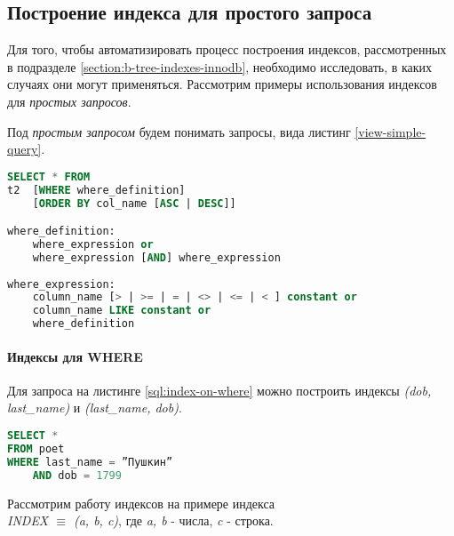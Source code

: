 \subsection{Построение индекса для простого запроса}
\label{section:simple-index}

Для того, чтобы автоматизировать процесс построения индексов, рассмотренных в подразделе \ref{section:b-tree-indexes-innodb}, необходимо исследовать, в каких случаях они могут применяться. Рассмотрим примеры использования индексов для \textit{простых запросов}.

Под \textit{простым запросом} будем понимать запросы, вида листинг \ref{view-simple-query}.

\begin{lstlisting}[language=sql, caption={Вид простого запроса},label=view-simple-query]
SELECT * FROM
t2  [WHERE where_definition]
    [ORDER BY col_name [ASC | DESC]]

where_definition:
    where_expression or 
    where_expression [AND] where_expression 
    
where_expression:
    column_name [> | >= | = | <> | <= | < ] constant or
    column_name LIKE constant or 
    where_definition   
\end{lstlisting}


\paragraph{Индексы для WHERE}

Для запроса на листинге \ref{sql:index-on-where} можно построить индексы \textit{(dob, last\_name)} и \textit{(last_name, dob)}.
\begin{lstlisting}[language=sql, label=sql:index-on-where, caption={запрос для index-on-where}]
SELECT * 
FROM poet
WHERE last_name = ”Пушкин” 
    AND dob = 1799
\end{lstlisting}

Рассмотрим работу индексов на примере индекса \\
\textit{INDEX $\equiv$ (a, b, c)}, где \textit{a, b} - числа, \textit{c} - строка.

